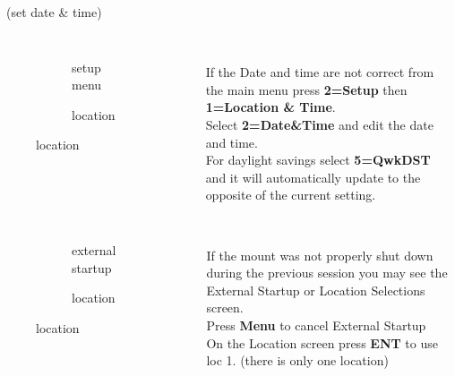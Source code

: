 \begin{frame}[t]{\insertsubsectionhead\ (set date \& time)}
  \begin{columns}[T]
  \begin{figure}[ht]
    \begin{subfigure}{0.67\textwidth}
    \caption{setup menu}
  \end{subfigure}
  \vspace{\fill}
  \begin{subfigure}{0.67\textwidth}
    \caption{location}
  \end{subfigure}
\end{figure}
  \large
  \ \\[0.25ex]
  If the Date and time are not correct from the main menu press \textbf{2=Setup}
  then \textbf{1=Location \& Time}.\\[1ex]

  Select \textbf{2=Date\&Time} and edit the date and time.\\[1ex]
  
  For daylight savings  select \textbf{5=QwkDST} and it will automatically update
  to the opposite  of the current setting.
\end{columns}
\end{frame}
\begin{frame}[t]{\insertsubsectionhead}
    \begin{columns}[T]
    \begin{figure}[ht]
      \begin{subfigure}{0.67\textwidth}
      \caption{external startup}
    \end{subfigure}
    \vspace{\fill}
    \begin{subfigure}{0.67\textwidth}
      \caption{location}
    \end{subfigure}
  \end{figure}
    \large
    \ \\[0.25ex]
    If the mount was not properly shut down during the previous session you may
    see the External Startup or Location Selections screen.\\[1ex]

    Press \textbf{Menu} to cancel External Startup\\[1ex]

    On the Location screen press \textbf{ENT} to use loc 1.
    (there is only one location)

  \end{columns}
\end{frame}

